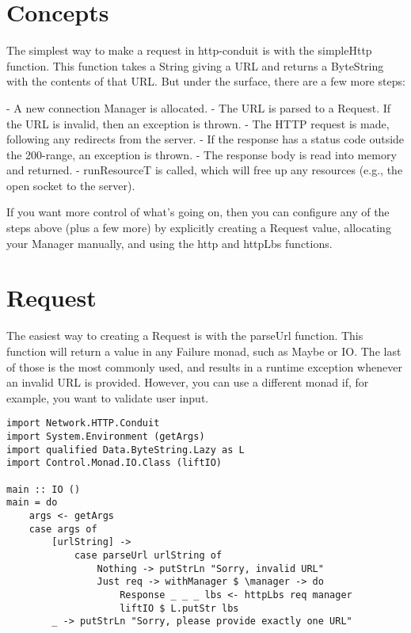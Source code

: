 \section{Concepts}

The simplest way to make a request in http-conduit is with the
simpleHttp function. This function takes a String giving a URL and
returns a ByteString with the contents of that URL. But under the
surface, there are a few more steps:

- A new connection Manager is allocated.
- The URL is parsed to a Request. If the URL is invalid, then an
  exception is thrown.
- The HTTP request is made, following any redirects from the server.
- If the response has a status code outside the 200-range, an exception is thrown.
- The response body is read into memory and returned.
- runResourceT is called, which will free up any resources (e.g., the open
  socket to the server).

If you want more control of what's going on, then you can configure
any of the steps above (plus a few more) by explicitly creating a
Request value, allocating your Manager manually, and using the http
and httpLbs functions.

\section{Request}

The easiest way to creating a Request is with the parseUrl
function. This function will return a value in any Failure monad, such
as Maybe or IO. The last of those is the most commonly used, and
results in a runtime exception whenever an invalid URL is
provided. However, you can use a different monad if, for example, you
want to validate user input.
\begin{lstlisting}
import Network.HTTP.Conduit
import System.Environment (getArgs)
import qualified Data.ByteString.Lazy as L
import Control.Monad.IO.Class (liftIO)

main :: IO ()
main = do
    args <- getArgs
    case args of
        [urlString] ->
            case parseUrl urlString of
                Nothing -> putStrLn "Sorry, invalid URL"
                Just req -> withManager $ \manager -> do
                    Response _ _ _ lbs <- httpLbs req manager
                    liftIO $ L.putStr lbs
        _ -> putStrLn "Sorry, please provide exactly one URL"
\end{lstlisting}


